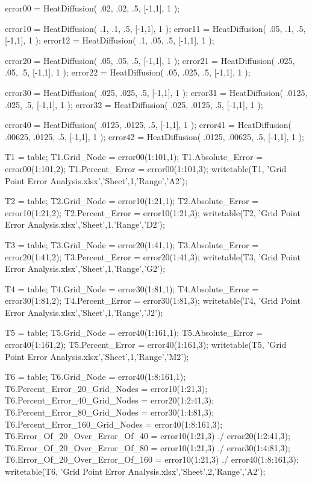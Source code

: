 \documentclass[12pt]{article}
\begin{document}
\begin{verbatimtab}
error00 = HeatDiffusion( .02, .02, .5, [-1,1], 1 );

error10 = HeatDiffusion( .1, .1, .5, [-1,1], 1 );
error11 = HeatDiffusion( .05, .1, .5, [-1,1], 1 );
error12 = HeatDiffusion( .1, .05, .5, [-1,1], 1 );

error20 = HeatDiffusion( .05, .05, .5, [-1,1], 1 );
error21 = HeatDiffusion( .025, .05, .5, [-1,1], 1 );
error22 = HeatDiffusion( .05, .025, .5, [-1,1], 1 );

error30 = HeatDiffusion( .025, .025, .5, [-1,1], 1 );
error31 = HeatDiffusion( .0125, .025, .5, [-1,1], 1 );
error32 = HeatDiffusion( .025, .0125, .5, [-1,1], 1 );

error40 = HeatDiffusion( .0125, .0125, .5, [-1,1], 1 );
error41 = HeatDiffusion( .00625, .0125, .5, [-1,1], 1 );
error42 = HeatDiffusion( .0125, .00625, .5, [-1,1], 1 );

T1 = table;
T1.Grid_Node = error00(1:101,1);
T1.Absolute_Error = error00(1:101,2);
T1.Percent_Error = error00(1:101,3);
writetable(T1, 'Grid Point Error Analysis.xlsx','Sheet',1,'Range','A2');

T2 = table;
T2.Grid_Node = error10(1:21,1);
T2.Absolute_Error = error10(1:21,2);
T2.Percent_Error = error10(1:21,3);
writetable(T2, 'Grid Point Error Analysis.xlsx','Sheet',1,'Range','D2');

T3 = table;
T3.Grid_Node = error20(1:41,1);
T3.Absolute_Error = error20(1:41,2);
T3.Percent_Error = error20(1:41,3);
writetable(T3, 'Grid Point Error Analysis.xlsx','Sheet',1,'Range','G2');

T4 = table;
T4.Grid_Node = error30(1:81,1);
T4.Absolute_Error = error30(1:81,2);
T4.Percent_Error = error30(1:81,3);
writetable(T4, 'Grid Point Error Analysis.xlsx','Sheet',1,'Range','J2');

T5 = table;
T5.Grid_Node = error40(1:161,1);
T5.Absolute_Error = error40(1:161,2);
T5.Percent_Error = error40(1:161,3);
writetable(T5, 'Grid Point Error Analysis.xlsx','Sheet',1,'Range','M2');

T6 = table;
T6.Grid_Node = error40(1:8:161,1);
T6.Percent_Error_20_Grid_Nodes = error10(1:21,3);
T6.Percent_Error_40_Grid_Nodes = error20(1:2:41,3);
T6.Percent_Error_80_Grid_Nodes = error30(1:4:81,3);
T6.Percent_Error_160_Grid_Nodes = error40(1:8:161,3);
T6.Error_Of_20_Over_Error_Of_40 = error10(1:21,3) ./ error20(1:2:41,3);
T6.Error_Of_20_Over_Error_Of_80 = error10(1:21,3) ./ error30(1:4:81,3);
T6.Error_Of_20_Over_Error_Of_160 = error10(1:21,3) ./ error40(1:8:161,3);
writetable(T6, 'Grid Point Error Analysis.xlsx','Sheet',2,'Range','A2');


\end{verbatimtab}
\end{document}
